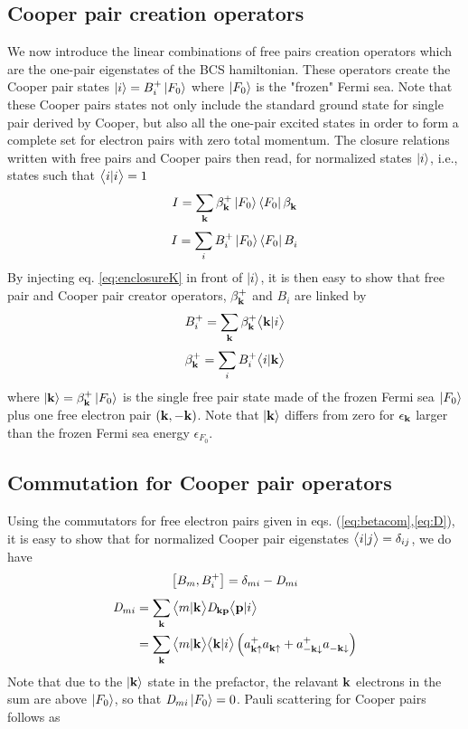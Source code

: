 \documentclass[aps,pra,amsmath,amssymb,preprint,groupedaddress]{revtex4}
\begin{document}
\subsection{Cooper pair creation operators}

We now introduce the linear combinations of free pairs creation operators which are the one-pair eigenstates of the BCS hamiltonian.  These operators create the Cooper pair states $\left|i\right>=B^+_i\left|F_0\right>$ where $\left|F_0\right>$ is the "frozen" Fermi sea. Note that these Cooper pairs states not only include the standard ground state for single pair derived by Cooper, but also all the one-pair excited states in order to form a complete set for electron pairs with zero total momentum.  The closure relations written with free pairs and Cooper pairs then read, for normalized  states $\left|i\right>$, i.e., states such that $\bigl<{{i}|{i}}\bigr>=1$
\begin{equation}\label{eq:enclosureK}
I=\sum_{\mathbf{k}}{\beta^+_{\mathbf{k}}\left|F_0\right>\left<F_0\right|\beta^{}_{\mathbf{k}}}
\end{equation}
\begin{equation}
I=\sum_i{B^+_i\left|F_0\right>\left<F_0\right|B^{}_i}
\end{equation}
By injecting eq. \eqref{eq:enclosureK} in front of $\left|i\right>$, it is then easy to show that free pair and Cooper pair creator operators, $\beta^+_{\mathbf{k}}$ and $B^{}_i$ are linked by 
\begin{equation}\label{eq:bbeta}
B^{+}_i=\sum_{\mathbf{k}}{\beta^+_{\mathbf{k}}\bigl<{{\mathbf{k}}|{i}}\bigr>}
\end{equation}
\begin{equation}
\beta^+_{\mathbf{k}}=\sum_iB^{+}_i{\bigl<{{i}|{\mathbf{k}}}\bigr>}
\end{equation}
where $\left|\mathbf{k}\right>=\beta^+_{\mathbf{k}}\left|F_0\right>$ is the single free pair state made of the frozen Fermi sea $\left|F_0\right>$ plus one free electron pair $\left(\mathbf{k},-\mathbf{k}\right)$. Note that $\left|\mathbf{k}\right>$ differs from zero for $\epsilon_{\mathbf{k}}$ larger than the frozen Fermi sea energy $\epsilon_{F_0}$.
\subsection{Commutation for Cooper pair operators}

Using the commutators for free electron pairs given in eqs. (\ref{eq:betacom},\ref{eq:D}), it is easy to show that for normalized Cooper pair eigenstates $\bigl<{{i}|{j}}\bigr>=\delta_{ij}$, we do have 
\begin{equation}\label{eq:bcom}
\left[B_m,B^+_i\right]=\delta_{mi}-\mathit{D}_{mi}
\end{equation}
\begin{equation}
\begin{split}
\mathit{D}_{mi}&=\sum_{\mathbf{k}}{\bigl<{{m}|{\mathbf{k}}}\bigr>\mathit{D}_{\mathbf{k}\mathbf{p}}\bigl<{{\mathbf{p}}|{i}}\bigr>}\\
			&=\sum_{\mathbf{k}}{\bigl<{{m}|{\mathbf{k}}}\bigr>\bigl<{{\mathbf{k}}|{i}}\bigr>}\left(a^+_{\mathbf{k}\uparrow}a^{}_{\mathbf{k}\uparrow}+a^+_{-\mathbf{k}\downarrow}a^{}_{-\mathbf{k}\downarrow}\right)
\end{split}
\end{equation}
Note that due to the $\left|\mathbf{k}\right>$ state in the prefactor,  the relavant  $\mathbf{k}$ electrons in the sum are above $\left|F_0\right>$, so that $\mathit{D}_{mi}\left|F_0\right>=0$.  Pauli scattering for Cooper pairs follows as
\end{document}
